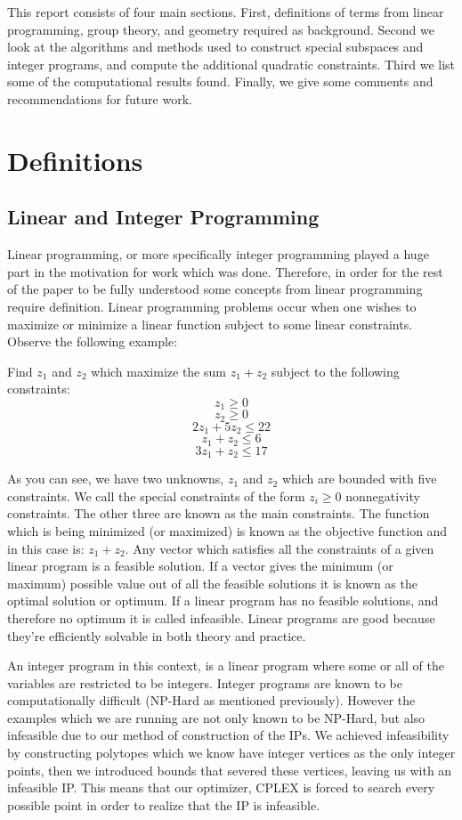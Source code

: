 \documentclass[11pt]{article} %
\theoremstyle{definition}
\theoremstyle{remark}
\begin{document}
This report consists of four main sections. First, definitions of terms from linear programming, group theory, and geometry required as background. Second we look at the algorithms and methods used to construct special subspaces and integer programs, and compute the additional quadratic constraints. Third we list some of the computational results found. Finally, we give some comments and recommendations for future work.

\section{Definitions}

\subsection{Linear and Integer Programming}

Linear programming, or more specifically integer programming played a huge part in the motivation for work which was done. Therefore, in order for the rest of the paper to be fully understood some concepts from linear programming require definition. Linear programming problems occur when one wishes to maximize or minimize a linear function subject to some linear constraints. Observe the following example:

Find $z_1$ and $z_2$ which maximize the sum $z_1 + z_2$ subject to the following constraints:
$$z_1 \geq 0$$
$$z_2 \geq 0$$
$$2z_1 + 5z_2 \leq 22 $$
$$z_1 + z_2 \leq 6$$ 
$$3z_1 + z_2 \leq 17$$

As you can see, we have two unknowns, $z_1$ and $z_2$ which are bounded with five constraints. We call the special constraints of the form $z_i \geq 0$ nonnegativity constraints. The other three are known as the main constraints.  The function which is being minimized (or maximized) is known as the objective function and in this case is: $z_1 + z_2$. Any vector which satisfies all the constraints of a given linear program is a feasible solution. If a vector gives the minimum (or maximum) possible value out of all the feasible solutions it is known as the optimal solution or optimum. If a linear program has no feasible solutions, and therefore no optimum it is called infeasible. Linear programs are good because they're efficiently solvable in both theory and practice. 

An integer program in this context, is a linear program where some or all of the variables are restricted to be integers. Integer programs are known to be computationally difficult (NP-Hard as mentioned previously). However the examples which we are running are not only known to be NP-Hard, but also infeasible due to our method of construction of the IPs. We achieved infeasibility by constructing polytopes which we know have integer vertices as the only integer points, then we introduced bounds that severed these vertices, leaving us with an infeasible IP. This means that our optimizer, CPLEX is forced to search every possible point in order to realize that the IP is infeasible. 
\end{document}
